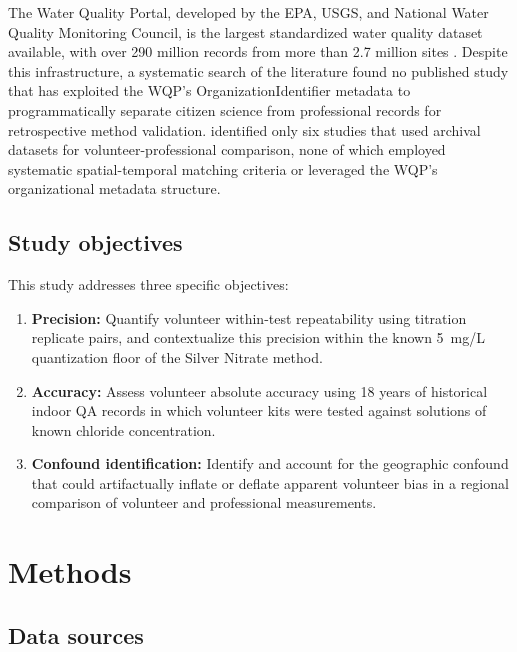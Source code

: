\documentclass[lineno]{wlpeerj}
\begin{document}
The Water Quality Portal, developed by the EPA, USGS, and National Water Quality Monitoring Council, is the largest standardized water quality dataset available, with over 290 million records from more than 2.7 million sites \citep{Read2017}. Despite this infrastructure, a systematic search of the literature found no published study that has exploited the WQP's OrganizationIdentifier metadata to programmatically separate citizen science from professional records for retrospective method validation. \citet{Albus2019} identified only six studies that used archival datasets for volunteer-professional comparison, none of which employed systematic spatial-temporal matching criteria or leveraged the WQP's organizational metadata structure.

\subsection{Study objectives}

This study addresses three specific objectives:

\begin{enumerate}
  \item \textbf{Precision:} Quantify volunteer within-test repeatability using titration replicate pairs, and contextualize this precision within the known 5~mg/L quantization floor of the Silver Nitrate method.
  \item \textbf{Accuracy:} Assess volunteer absolute accuracy using 18 years of historical indoor QA records in which volunteer kits were tested against solutions of known chloride concentration.
  \item \textbf{Confound identification:} Identify and account for the geographic confound that could artifactually inflate or deflate apparent volunteer bias in a regional comparison of volunteer and professional measurements.
\end{enumerate}

\section{Methods}

\subsection{Data sources}
\end{document}
